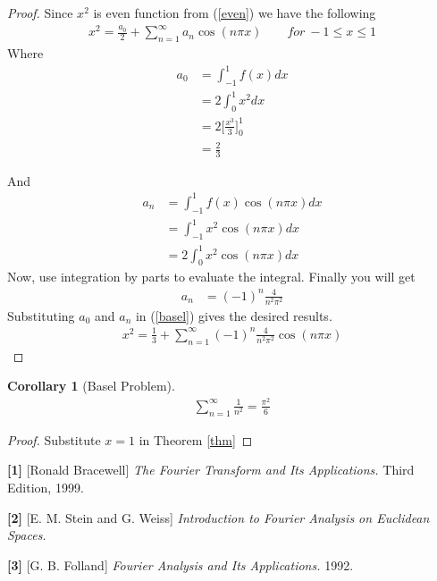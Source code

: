 \documentclass[paper=a4, fontsize=11pt,twoside]{scrartcl}		%
\newtheorem{cor}[thm]{Corollary}
\begin{document}
\begin{proof}
Since $x^2$ is even function from (\ref{even}) we have the following
\begin{align}\label{basel}
x^2=\frac{a_0}{2}+\sum_{n=1}^\infty  a_{n}\cos(n\pi x) \qquad for~-1\leq x\leq 1
\end{align}
Where \begin{align*}
a_0&=\int_{-1}^{1} f(x)dx \\
&=2\int_{0}^{1} x^2 dx \\
&=2\biggl[ \frac{x^3}{3}\biggl]_{0}^{1}\\
&=\frac{2}{3}
\end{align*}

And
\begin{align*}
 a_n&=\int_{-1}^{1} f(x)\cos(n\pi x)dx\\
 &=\int_{-1}^{1} x^2\cos(n\pi x)dx\\
 &=2\int_{0}^{1} x^2\cos(n\pi x)dx
\end{align*}
Now, use integration by parts to evaluate the integral. Finally you will get
\begin{align*}
 a_n&=(-1)^n\frac{4}{n^2\pi^2}
\end{align*}
Substituting $a_0$ and $a_n$ in (\ref{basel}) gives the desired results.
 \begin{align*}
 x^2=\frac{1}{3}+\sum_{n=1}^{\infty} (-1)^n \frac{4}{n^2\pi^2}\cos(n\pi x)
 \end{align*}
\end{proof}

\begin{cor}[Basel Problem]
\begin{align*}
\sum_{n=1}^{\infty}\frac{1}{n^2}=\frac{\pi^2}{6}
\end{align*}
\end{cor}
\begin{proof}
Substitute $x=1$ in Theorem \ref{thm}
\end{proof}


\begin{thebibliography}{6}



{\small

\item[\textbf{[1]}] %
[Ronald Bracewell] \textit{The Fourier Transform and Its Applications.} Third Edition, 1999.

\item[\textbf{[2]}] %
[E. M. Stein and G. Weiss]
\textit{Introduction to Fourier Analysis on Euclidean Spaces.}

\item[\textbf{[3]}]
[G. B. Folland]  \textit{Fourier Analysis and Its Applications.} 1992.
}

\end{thebibliography}
\end{document}
